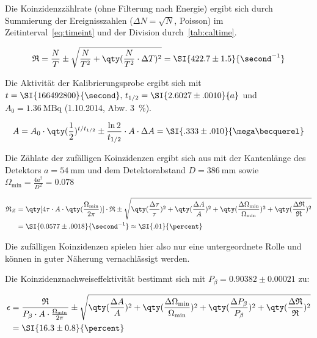 \documentclass[slug=PET, room=Andreas-Schubert-Bau\,\ 424A, supervisor=Carsten\ Bittrich, coursedate=10.\ 01.\ 2020]{../../Lab_Report_LaTeX/lab_report}
\begin{document}
Die Koinzidenzz\"ahlrate (ohne Filterung nach Energie) ergibt sich
durch Summierung der Ereignisszahlen (\(\Delta N = \sqrt{N}\),
Poisson) im Zeitinterval~\eqref{eq:timeint} und der Division
durch~\eqref{tab:caltime}.

\begin{equation}
  \label{eq:ctrate}
  \mathfrak{R} = \frac{N}{T} \pm \sqrt{\frac{N}{T^2} +
    \qty(\frac{N}{T^2}\cdot \Delta T)^2} = \SI{422.7\pm 1.5}{\second^{-1}}
\end{equation}

Die Aktivität der  Kalibrierungsprobe ergibt sich mit
\(t=\SI{166492800}{\second},\, t_{1/2} = \SI{2.6027\pm .0010}{a}\) und \(A_0
= \SI{1.36}{\mega\becquerel}\) (1.10.2014, Abw. \SI{3}{\percent}).

\begin{equation}
  \label{eq:acttoday}
  A = A_0\cdot \qty(\frac{1}{2})^{t/t_{1/2}} \pm
  \frac{\ln{2}}{t_{1/2}}\cdot A\cdot\Delta A = \SI{.333\pm.010}{\mega\becquerel}
\end{equation}

Die Z\"ahlate der zuf\"alligen Koinzidenzen ergibt sich aus
mit der Kantenl\"ange des Detektors
\(a=\SI{54}{\milli\meter}\) und dem Detektorabstand
\(D=\SI{386}{\milli\meter}\) sowie
\(\Omega_{\min} = \frac{4a^2}{D^2} = 0.078\)

\begin{align}
  \label{eq:incidentalrate}
  \mathfrak{R}_Z &= \qty[4\tau\cdot A\cdot
  \qty(\frac{\Omega_{\min}}{2\pi})]\cdot \mathfrak{R} \pm
  \sqrt{\qty(\frac{\Delta\tau}{\tau})^2 + \qty(\frac{\Delta A}{A})^2 +
    \qty(\frac{\Delta\Omega_{\min}}{\Omega_{\min}})^2 +
                   \qty(\frac{\Delta\mathfrak{R}}{\mathfrak{R}})^2} \\
                 &= \SI{0.0577\pm .0018}{\second^{-1}} \approx \SI{.01}{\percent}
\end{align}

Die zuf\"alligen Koinzidenzen spielen hier also nur eine
untergeordnete Rolle und k\"onnen in guter N\"aherung vernachl\"assigt
werden.

Die Koinzidenznachweiseffektivit\"at bestimmt sich
mit \(P_\beta = 0.90382\pm 0.00021\) zu:

\begin{align}
  \epsilon & = \frac{\mathfrak{R}}{P_\beta\cdot A \cdot
  \frac{\Omega_{\min}}{2\pi}} \pm \sqrt{\qty(\frac{\Delta A}{A})^2 +
  \qty(\frac{\Delta\Omega_{\min}}{\Omega_{\min}})^2 +
  \qty(\frac{\Delta P_\beta}{P_\beta})^2 +
             \qty(\frac{\Delta\mathfrak{R}}{\mathfrak{R}})^2} \\
  & = \SI{16.3\pm 0.8}{\percent}
\end{align}
\end{document}

